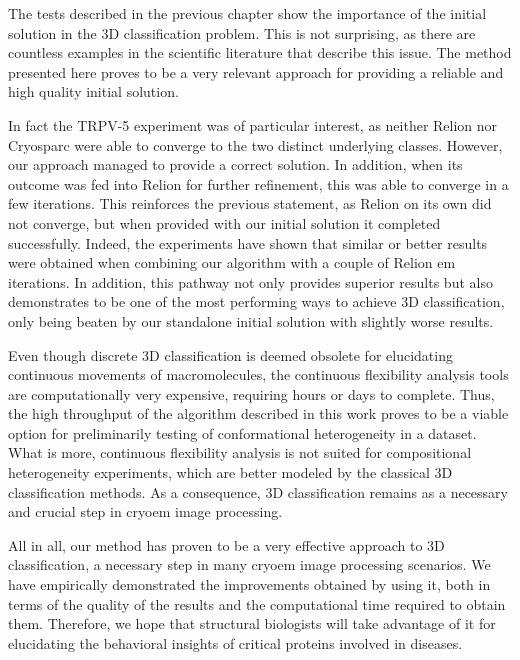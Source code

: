 \documentclass[../main.tex]{subfiles}
\begin{document}
The tests described in the previous chapter show the importance of the initial solution in the 3D classification problem. This is not surprising, as there are countless examples in the scientific literature that describe this issue. The method presented here proves to be a very relevant approach for providing a reliable and high quality initial solution.

In fact the TRPV-5 experiment was of particular interest, as neither Relion nor Cryosparc were able to converge to the two distinct underlying classes. However, our approach managed to provide a correct solution. In addition, when its outcome was fed into Relion for further refinement, this was able to converge in a few iterations. This reinforces the previous statement, as Relion on its own did not converge, but when provided with our initial solution it completed successfully. Indeed, the experiments have shown that similar or better results were obtained when combining our algorithm with a couple of Relion \gls{em} iterations. In addition, this pathway not only provides superior results but also demonstrates to be one of the most performing ways to achieve 3D classification, only being beaten by our standalone initial solution with slightly worse results.

Even though discrete 3D classification is deemed obsolete for elucidating continuous movements of macromolecules, the continuous flexibility analysis tools are computationally very expensive, requiring hours or days to complete. Thus, the high throughput of the algorithm described in this work proves to be a viable option for preliminarily testing of conformational heterogeneity in a dataset. What is more, continuous flexibility analysis is not suited for compositional heterogeneity experiments, which are better modeled by the classical 3D classification methods. As a consequence, 3D classification remains as a necessary and crucial step in \gls{cryoem} image processing.

All in all, our method has proven to be a very effective approach to 3D classification, a necessary step in many \gls{cryoem} image processing scenarios. We have empirically demonstrated the improvements obtained by using it, both in terms of the quality of the results and the computational time required to obtain them. Therefore, we hope that structural biologists will take advantage of it for elucidating the behavioral insights of critical proteins involved in diseases.
\end{document}
